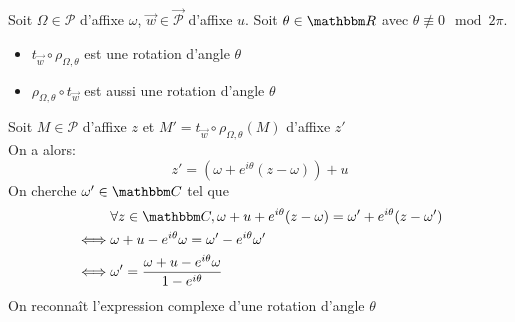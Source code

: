 \begin{prop}
	Soit $\Omega\in \mathcal{P}$ d'affixe $\omega$, $\vec{w} \in \vec{\mathcal{P}}$ d'affixe $u$. Soit $\theta\in \R$ avec $\theta\not\equiv 0\mod{2\pi}$.
	\begin{itemize}
		\item $t_{\vec{w}} \circ \rho_{\Omega,\theta}$ est une rotation d'angle $\theta$
		\item $\rho_{\Omega,\theta} \circ t_{\vec{w}}$ est aussi une rotation d'angle $\theta$
	\end{itemize}
\end{prop}

\begin{prv}
	Soit $M \in \mathcal{P}$ d'affixe $z$ et $M' = t_{\vec{w}} \circ \rho_{\Omega, \theta}(M)$ d'affixe $z'$ \\
	On a alors: \[
		z' = (\omega + e^{i\theta}(z-\omega))+u
	\]
	On cherche $\omega' \in \C$ tel que
	\begin{align*}
		&\forall z \in \C, \omega+u+e^{i\theta}(z-\omega) = \omega' + e^{i\theta}(z-\omega')\\
		\iff& \omega+u-e^{i\theta}\omega = \omega' - e^{i\theta}\omega'\\
		\iff& \omega' = \frac{\omega + u - e^{i\theta}\omega}{1-e^{i\theta}}
	\end{align*}
	On reconnaît l'expression complexe d'une rotation d'angle $\theta$
\end{prv}

